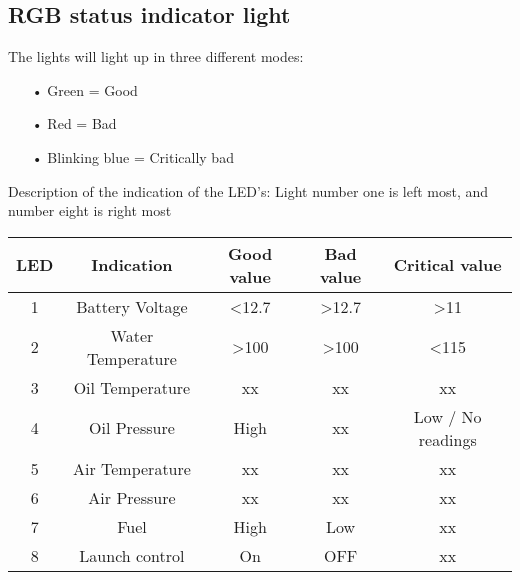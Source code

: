 \subsection*{RGB status indicator light}
The lights will light up in three different modes:

\begin{enumerate}
	\item[•]Green = Good
	\item[•]Red = Bad
	\item[•]Blinking blue = Critically bad
\end{enumerate}
Description of the indication of the LED's:
Light number one is left most, and number eight is right most
\begin{center}
  \begin{tabular}{| c | c | c | c | c |}
    \hline
    LED & Indication & Good value & Bad value & Critical value \\ \hline
    1 & Battery Voltage & <12.7 & >12.7 & >11 \\ \hline
    2 & Water Temperature & >100 & >100 & <115  \\ \hline
    3 & Oil Temperature & xx & xx & xx \\ \hline
    4 & Oil Pressure & High & xx & Low / No readings \\ \hline
    5 & Air Temperature & xx & xx & xx \\ \hline
    6 & Air Pressure & xx & xx & xx \\ \hline
    7 & Fuel & High & Low & xx \\ \hline
    8 & Launch control & On & OFF & xx \\ \hline
  \end{tabular}
\end{center}

